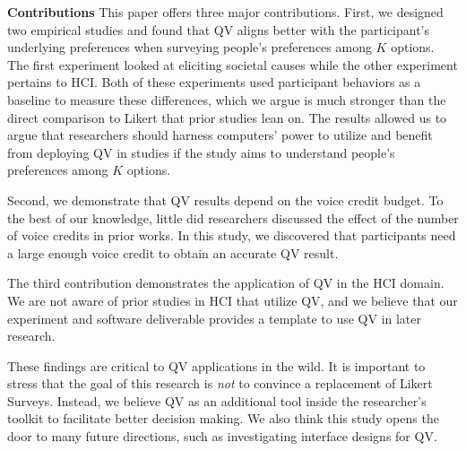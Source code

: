 

\textbf{Contributions}
This paper offers three major contributions.
First, we designed two empirical studies and found that QV aligns better with the participant's underlying preferences when surveying people's preferences among $K$ options. The first experiment looked at eliciting societal causes while the other experiment pertains to HCI. Both of these experiments used participant behaviors as a baseline to measure these differences, which we argue is much stronger than the direct comparison to Likert that prior studies lean on. The results allowed us to argue that researchers should harness computers' power to utilize and benefit from deploying QV in studies if the study aims to understand people's preferences among $K$ options.

Second, we demonstrate that QV results depend on the voice credit budget. To the best of our knowledge, little did researchers discussed the effect of the number of voice credits in prior works. In this study, we discovered that participants need a large enough voice credit to obtain an accurate QV result.

The third contribution demonstrates the application of QV in the HCI domain. We are not aware of prior studies in HCI that utilize QV, and we believe that our experiment and software deliverable provides a template to use QV in later research.

These findings are critical to QV applications in the wild. It is important to stress that the goal of this research is \textit{not} to convince a replacement of Likert Surveys. Instead, we believe QV as an additional tool inside the researcher's toolkit to facilitate better decision making. We also think this study opens the door to many future directions, such as investigating interface designs for QV.















